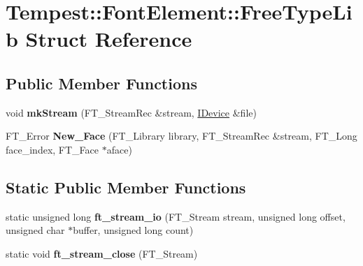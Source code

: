 \hypertarget{struct_tempest_1_1_font_element_1_1_free_type_lib}{\section{Tempest\+:\+:Font\+Element\+:\+:Free\+Type\+Lib Struct Reference}
\label{struct_tempest_1_1_font_element_1_1_free_type_lib}
}
\subsection*{Public Member Functions}
\begin{DoxyCompactItemize}
\item 
\hypertarget{struct_tempest_1_1_font_element_1_1_free_type_lib_af064d8559be12b008146501c40f2ad7a}{void {\bfseries mk\+Stream} (F\+T\+\_\+\+Stream\+Rec \&stream, \hyperlink{class_tempest_1_1_i_device}{I\+Device} \&file)}\label{struct_tempest_1_1_font_element_1_1_free_type_lib_af064d8559be12b008146501c40f2ad7a}

\item 
\hypertarget{struct_tempest_1_1_font_element_1_1_free_type_lib_abe53b2340b7ad4b1a292a3b88ba1b24e}{F\+T\+\_\+\+Error {\bfseries New\+\_\+\+Face} (F\+T\+\_\+\+Library library, F\+T\+\_\+\+Stream\+Rec \&stream, F\+T\+\_\+\+Long face\+\_\+index, F\+T\+\_\+\+Face $\ast$aface)}\label{struct_tempest_1_1_font_element_1_1_free_type_lib_abe53b2340b7ad4b1a292a3b88ba1b24e}

\end{DoxyCompactItemize}
\subsection*{Static Public Member Functions}
\begin{DoxyCompactItemize}
\item 
\hypertarget{struct_tempest_1_1_font_element_1_1_free_type_lib_aadb850babb7d898dd357df53c6bbb775}{static unsigned long {\bfseries ft\+\_\+stream\+\_\+io} (F\+T\+\_\+\+Stream stream, unsigned long offset, unsigned char $\ast$buffer, unsigned long count)}\label{struct_tempest_1_1_font_element_1_1_free_type_lib_aadb850babb7d898dd357df53c6bbb775}

\item 
\hypertarget{struct_tempest_1_1_font_element_1_1_free_type_lib_a4c7887832e68b364647f79b31ae212c1}{static void {\bfseries ft\+\_\+stream\+\_\+close} (F\+T\+\_\+\+Stream)}\label{struct_tempest_1_1_font_element_1_1_free_type_lib_a4c7887832e68b364647f79b31ae212c1}

\end{DoxyCompactItemize}
